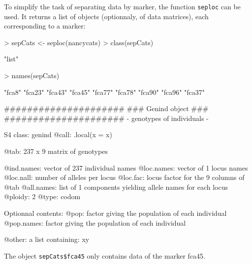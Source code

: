\documentclass{article}
\begin{document}
To simplify the task of separating data by marker, the function
\texttt{seploc} can be used.
It returns a list of objects (optionnaly, of data matrices), each
corresponding to a marker:
\begin{Schunk}
\begin{Sinput}
> sepCats <- seploc(nancycats)
> class(sepCats)
\end{Sinput}
\begin{Soutput}
[1] "list"
\end{Soutput}
\begin{Sinput}
> names(sepCats)
\end{Sinput}
\begin{Soutput}
[1] "fca8"  "fca23" "fca43" "fca45" "fca77" "fca78" "fca90" "fca96" "fca37"
\end{Soutput}
\begin{Soutput}
   #####################
   ### Genind object ### 
   #####################
- genotypes of individuals - 

S4 class:  genind
@call: .local(x = x)

@tab:  237 x 9 matrix of genotypes

@ind.names: vector of  237 individual names
@loc.names: vector of  1 locus names
@loc.nall: number of alleles per locus
@loc.fac: locus factor for the  9 columns of @tab
@all.names: list of  1 components yielding allele names for each locus
@ploidy:  2
@type:  codom

Optionnal contents: 
@pop:  factor giving the population of each individual
@pop.names:  factor giving the population of each individual

@other: a list containing: xy 
\end{Soutput}
\end{Schunk}

\noindent The object \texttt{sepCats\$fca45} only contains data of the
marker fca45.
\\
\end{document}
